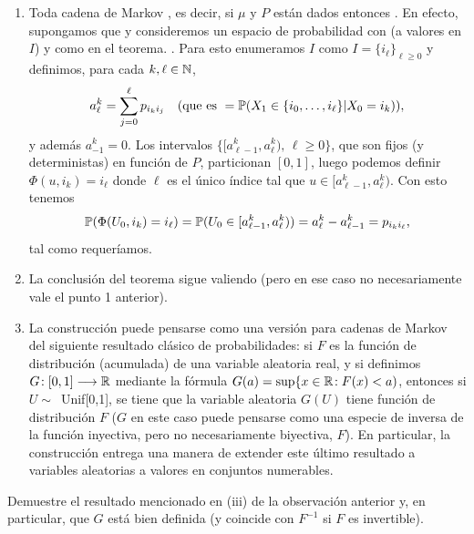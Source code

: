 \begin{rem}
\leavevmode
\begin{enumerate}
\item Toda cadena de Markov , es decir, si $\mu$ y $P$ están dados entonces .
\lsep
En efecto, supongamos que  y consideremos un espacio de probabilidad con  (a valores en $I$) y  como en el teorema.
.
Para esto enumeramos $I$ como $I=\{i_\ell\}_{\ell\geq0}$ y definimos, para cada $k,\ell\in\mathbb{N}$,
\[a^{k}_\ell=\sum_{j=0}^\ell p_{i_ki_j}\quad\text{\upshape{(que es }}=\mathbb{P}(X_1\in\{i_0,\dotsc,i_\ell\}|X_0=i_k)\text{\upshape{)}},\]
y además $a^k_{-1}=0$.
Los intervalos $\{[a^k_{\ell-1},a^k_\ell),\,\ell\geq0\}$, que son fijos (y deterministas) en función de $P$, particionan $[0,1]$, luego podemos definir $\Phi(u,i_k)=i_\ell$ donde $\ell$ es el único índice tal que $u\in[a^k_{\ell-1},a^k_\ell)$.
Con esto tenemos
\[\mathbb{P}(\Phi(U_0,i_k)=i_\ell)=\mathbb{P}(U_0\in[a^k_{\ell-1},a^k_\ell))=a^k_\ell-a^k_{\ell-1}=p_{i_ki_\ell},\]
tal como requeríamos.
\item La conclusión del teorema sigue valiendo  (pero en ese caso no necesariamente vale el punto 1 anterior).
\item La construcción puede pensarse como una versión para cadenas de Markov del siguiente resultado clásico de probabilidades: si $F$ es  la función de distribución (acumulada) de una variable aleatoria real, y si definimos $G\!:[0,1]\longrightarrow\mathbb{R}$ mediante la fórmula $G(a)=\sup\{x\in\mathbb{R}\!:F(x)<a)$, entonces si $U\sim$~Unif[0,1], se tiene que la variable aleatoria $G(U)$ tiene función de distribución $F$ ($G$ en este caso puede pensarse como una especie de inversa de la función inyectiva, pero no necesariamente biyectiva, $F$).
\lsep 
En particular, la construcción entrega una manera de extender este último resultado a variables aleatorias a valores en conjuntos numerables.
\end{enumerate}
\end{rem}

\begin{exer}
Demuestre el resultado mencionado en (iii) de la observación anterior y, en particular, que $G$ está bien definida (y coincide con $F^{-1}$ si $F$ es invertible).
\end{exer}

